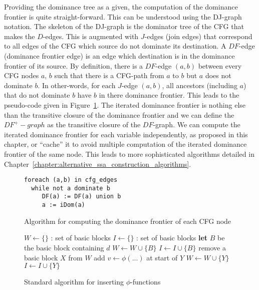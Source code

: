 Providing the dominance tree as a given, the computation of the dominance frontier is quite straight-forward. This can be understood using the DJ-graph notation. The skeleton of the DJ-graph is the dominator tree of the CFG that makes the $D$-edges. This is augmented with $J$-edges (join edges) that correspond to all edges of the CFG which source do not dominate its destination. A $DF$-edge (dominance frontier edge) is an edge which destination is in the dominance frontier of its source. By definition, there is a $DF$-edge $(a,b)$ between every CFG nodes $a$, $b$ such that there is a CFG-path from $a$ to $b$ but $a$ does not dominate $b$. 
In other-words, for each  $J$-edge $(a,b)$, all ancestors (including $a$) that do not dominate $b$ have $b$ in there dominance frontier. This leads to the pseudo-code given in Figure~\ref{fig:classical_construction:df}. The iterated dominance frontier is nothing else than the transitive closure of the dominance frontier and we can define the $DF^+-graph$ as the transitive closure of the $DF$-graph. We can compute the iterated dominance frontier for each variable independently, as proposed in this chapter, or ``cache'' it to avoid multiple computation of the iterated dominance frontier of the same node. This leads to more sophisticated algorithms detailed in Chapter~\ref{chapter:alternative_ssa_construction_algorithms}.

\begin{figure}
\begin{verbatim}
foreach (a,b) in cfg_edges
  while not a dominate b
     DF(a) := DF(a) union b
     a := iDom(a)
\end{verbatim}
\caption{\label{fig:classical_construction:df}Algorithm for computing the dominance frontier of each CFG node}
\end{figure}

\begin{figure}

\begin{algorithmic}[1]
\STATE $W \leftarrow \{ \}$ : set of basic blocks
\STATE $I \leftarrow \{ \}$ : set of basic blocks
    \STATE \textbf{let} $B$ be the basic block containing $d$
    \STATE $W \leftarrow W \cup \{ B \}$
    \STATE $I \leftarrow I \cup \{ B \}$
  \ENDFOR
    \STATE remove a basic block $X$ from $W$
        \STATE add $v \leftarrow \phi(...)$ at start of $Y$
          \STATE $W \leftarrow W \cup \{ Y \}$
          \STATE $I \leftarrow I \cup \{ Y \}$
        \ENDIF
      \ENDIF
    \ENDFOR
  \ENDWHILE
\ENDFOR
\end{algorithmic}
\caption{\label{fig:classical_construction:phi_insertion}Standard algorithm for inserting $\phi$-functions}
\end{figure}


